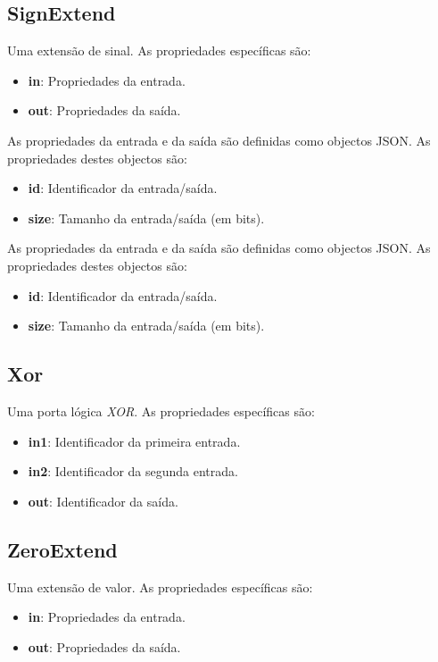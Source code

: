 \documentclass[11pt,a4paper,twoside,titlepage]{report}
\begin{document}
\subsection{SignExtend}

Uma extensão de sinal. As propriedades específicas são:
\begin{itemize}
	\item \textbf{in}: Propriedades da entrada.
	\item \textbf{out}: Propriedades da saída.
\end{itemize}

As propriedades da entrada e da saída são definidas como objectos JSON.
As propriedades destes objectos são:
\begin{itemize}
	\item \textbf{id}: Identificador da entrada/saída.
	\item \textbf{size}: Tamanho da entrada/saída (em bits).
\end{itemize}

As propriedades da entrada e da saída são definidas como objectos JSON.
As propriedades destes objectos são:
\begin{itemize}
	\item \textbf{id}: Identificador da entrada/saída.
	\item \textbf{size}: Tamanho da entrada/saída (em bits).
\end{itemize}

\subsection{Xor}

Uma porta lógica \emph{XOR}. As propriedades específicas são:
\begin{itemize}
	\item \textbf{in1}: Identificador da primeira entrada.
	\item \textbf{in2}: Identificador da segunda entrada.
	\item \textbf{out}: Identificador da saída.
\end{itemize}

\subsection{ZeroExtend}
Uma extensão de valor. As propriedades específicas são:
\begin{itemize}
	\item \textbf{in}: Propriedades da entrada.
	\item \textbf{out}: Propriedades da saída.
\end{itemize}
\end{document}
